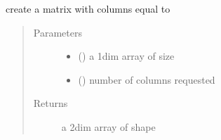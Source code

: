 \documentclass[letterpaper,10pt,english]{sphinxmanual}
\begin{document}
\begin{fulllineitems}
\label{\detokenize{ipfp_utils:ipfp_utils.nprepeat_col}}
create a matrix with  columns equal to 
\begin{quote}\begin{description}
\item[{Parameters}] \leavevmode\begin{itemize}
\item {} 
 () \textendash{} a 1\sphinxhyphen{}dim array of size 

\item {} 
 () \textendash{} number of columns requested

\end{itemize}

\item[{Returns}] \leavevmode
a 2\sphinxhyphen{}dim array of shape 

\end{description}\end{quote}

\end{fulllineitems}

\end{document}
